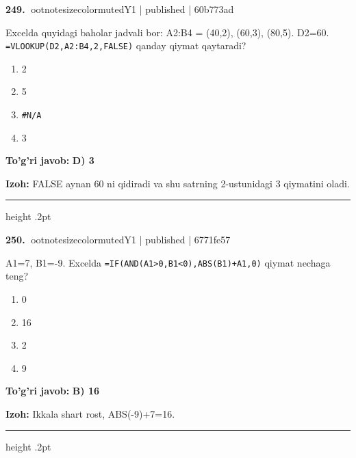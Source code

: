 \documentclass[10pt,a4paper]{article}
\begin{document}
\textbf{\color{ink}249.} {ootnotesizecolor{muted}Y1 | published | 60b773ad}
\par
Excelda quyidagi baholar jadvali bor: A2:B4 = (40,2), (60,3), (80,5). D2=60. \texttt{=VLOOKUP(D2,A2:B4,2,FALSE)} qanday qiymat qaytaradi?
\begin{enumerate}[label=\Alph*),leftmargin=9mm]
\item 2
\item 5
\item \texttt{\#N/A}
\item 3
\end{enumerate}
\begin{tcolorbox}[enhanced,breakable,colback=teal!4,colframe=teal!55!black,boxrule=0.45pt,arc=1.2mm,left=2.8mm,right=2.8mm,top=2mm,bottom=2mm]
\textbf{\color{teal}To'g'ri javob:} \textbf{D) 3}
\par\smallskip
\textbf{Izoh:} FALSE aynan 60 ni qidiradi va shu satrning 2-ustunidagi 3 qiymatini oladi.
\end{tcolorbox}
\vspace{2mm}\hrule height .2pt\vspace{2mm}

\textbf{\color{ink}250.} {ootnotesizecolor{muted}Y1 | published | 6771fe57}
\par
A1=7, B1=-9. Excelda \texttt{=IF(AND(A1\textgreater{}0,B1\textless{}0),ABS(B1)+A1,0)} qiymat nechaga teng?
\begin{enumerate}[label=\Alph*),leftmargin=9mm]
\item 0
\item 16
\item 2
\item 9
\end{enumerate}
\begin{tcolorbox}[enhanced,breakable,colback=teal!4,colframe=teal!55!black,boxrule=0.45pt,arc=1.2mm,left=2.8mm,right=2.8mm,top=2mm,bottom=2mm]
\textbf{\color{teal}To'g'ri javob:} \textbf{B) 16}
\par\smallskip
\textbf{Izoh:} Ikkala shart rost, ABS(-9)+7=16.
\end{tcolorbox}
\vspace{2mm}\hrule height .2pt\vspace{2mm}
\end{document}
